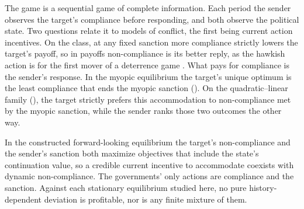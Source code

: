 The game is a sequential game of complete information. Each period the sender
observes the target's compliance before responding, and both observe the political
state. Two questions relate it to models of conflict, the first being current
action incentives. On the class, at any fixed sanction more compliance strictly
lowers the target's payoff, so in payoffs non-compliance is its better reply, as the
hawkish action is for the first mover of a deterrence game
\citep{AcemogluWolitzkyMistrust}. What pays for compliance is the sender's
response. In the myopic equilibrium the target's unique optimum is the least
compliance that ends the myopic sanction (). On the
quadratic--linear family (), the target strictly prefers this
accommodation to
non-compliance met by the myopic sanction, while the sender ranks those two outcomes the
other way.

 In the constructed
forward-looking equilibrium the target's non-compliance and the sender's sanction both
maximize objectives that include the state's continuation value, so a credible
current incentive to accommodate coexists with dynamic non-compliance. The governments'
only actions are compliance and the sanction. Against each stationary equilibrium
studied here, no pure history-dependent deviation is profitable, nor is any finite
mixture of them.
